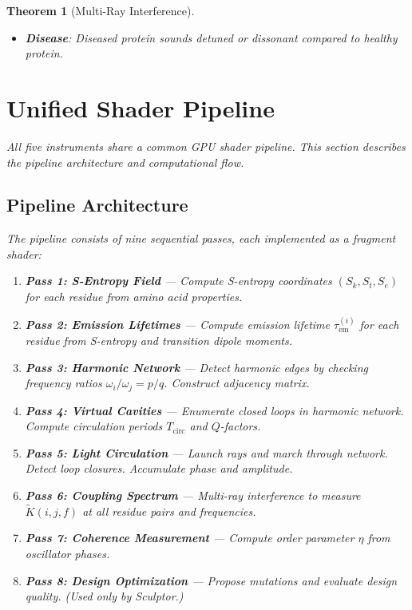 \documentclass[11pt,a4paper]{article}
\newtheorem{theorem}{Theorem}[section]
\begin{document}
\begin{theorem}[Multi-Ray Interference]
\begin{itemize}
\item \textbf{Disease}: Diseased protein sounds detuned or dissonant compared to healthy protein.
\end{itemize}

\section{Unified Shader Pipeline}

All five instruments share a common GPU shader pipeline. This section describes the pipeline architecture and computational flow.

\subsection{Pipeline Architecture}

The pipeline consists of nine sequential passes, each implemented as a fragment shader:

\begin{enumerate}
\item \textbf{Pass 1: S-Entropy Field} — Compute S-entropy coordinates $(S_k, S_t, S_e)$ for each residue from amino acid properties.

\item \textbf{Pass 2: Emission Lifetimes} — Compute emission lifetime $\tau_{\text{em}}^{(i)}$ for each residue from S-entropy and transition dipole moments.

\item \textbf{Pass 3: Harmonic Network} — Detect harmonic edges by checking frequency ratios $\omega_i/\omega_j = p/q$. Construct adjacency matrix.

\item \textbf{Pass 4: Virtual Cavities} — Enumerate closed loops in harmonic network. Compute circulation periods $T_{\text{circ}}$ and $Q$-factors.

\item \textbf{Pass 5: Light Circulation} — Launch rays and march through network. Detect loop closures. Accumulate phase and amplitude.

\item \textbf{Pass 6: Coupling Spectrum} — Multi-ray interference to measure $\tilde{K}(i,j,f)$ at all residue pairs and frequencies.

\item \textbf{Pass 7: Coherence Measurement} — Compute order parameter $\eta$ from oscillator phases.

\item \textbf{Pass 8: Design Optimization} — Propose mutations and evaluate design quality. (Used only by Sculptor.)


\end{enumerate}
\end{theorem}
\end{document}
